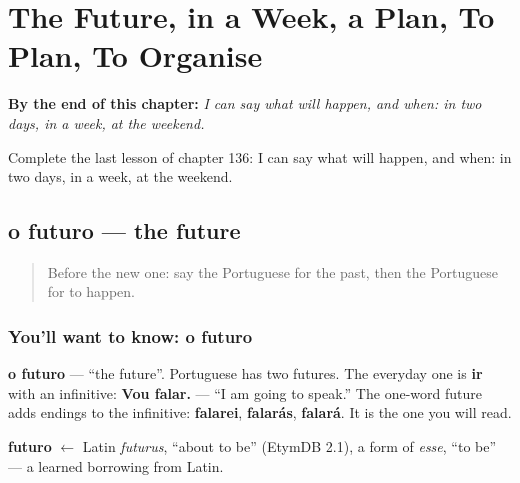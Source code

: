 
\chapter{The Future, in a Week, a Plan, To Plan, To Organise}
\label{ch:pt-the-future-in-a-week-a-plan-to-plan-to-organise}

\begin{chapteropening}
\textbf{By the end of this chapter:} \emph{I can say what will happen, and when: in two days, in a week, at the weekend.}

Complete the last lesson of chapter 136: I can say what will happen, and when: in two days, in a week, at the weekend.
\end{chapteropening}

\section[o futuro]{o futuro — the future}

\label{lesson:PT-C136-o-futuro}



\begin{quote}
Before the new one: say the Portuguese for the past, then the Portuguese for to happen.
\end{quote}

\subsection*{You'll want to know: o futuro}
\textbf{o futuro} — \textquotedblleft{}the future\textquotedblright{}. Portuguese has two futures. The everyday one is \textbf{ir} with an infinitive: \textbf{Vou falar.} — \textquotedblleft{}I am going to speak.\textquotedblright{} The one-word future adds endings to the infinitive: \textbf{falarei}, \textbf{falarás}, \textbf{falará}. It is the one you will read.

\begin{cousinweb}
\textbf{futuro} $\leftarrow$ Latin \emph{futurus}, \textquotedblleft{}about to be\textquotedblright{} (EtymDB 2.1), a form of \emph{esse}, \textquotedblleft{}to be\textquotedblright{} — a learned borrowing from Latin.
\end{cousinweb}

